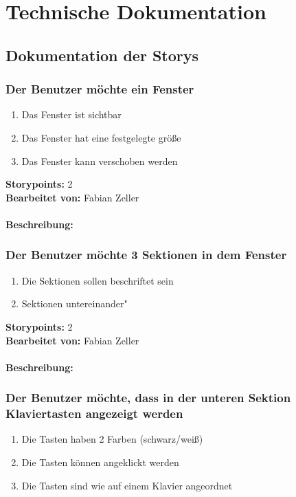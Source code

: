 \section{Technische Dokumentation}
\subsection{Dokumentation der Storys}

\subsubsection{Der Benutzer möchte ein Fenster}

\begin{enumerate}
 \item Das Fenster ist sichtbar
 \item Das Fenster hat eine festgelegte größe
 \item Das Fenster kann verschoben werden
\end{enumerate}

\textbf{Storypoints:} 2 \\
\textbf{Bearbeitet von:} Fabian Zeller \\
\\
\textbf{Beschreibung:} 


\subsubsection{Der Benutzer möchte 3 Sektionen in dem Fenster}


\begin{enumerate}
 \item Die Sektionen sollen beschriftet sein
 \item Sektionen untereinander"
\end{enumerate}

\textbf{Storypoints:} 2 \\
\textbf{Bearbeitet von:} Fabian Zeller \\
\\
\textbf{Beschreibung:} 


\subsubsection{Der Benutzer möchte, dass in der unteren Sektion Klaviertasten angezeigt werden}

\begin{enumerate}
 \item Die Tasten haben 2 Farben (schwarz/weiß)
 \item Die Tasten können angeklickt werden
 \item Die Tasten sind wie auf einem Klavier angeordnet
\end{enumerate}

